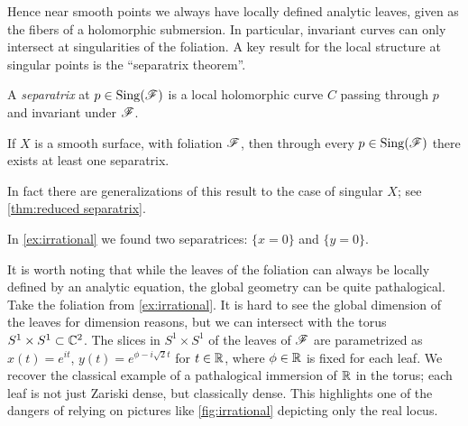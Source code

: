 Hence near smooth points we always have locally defined analytic leaves, given
as the fibers of a holomorphic submersion. In particular, invariant curves can
only intersect at singularities of the foliation. A key result for the local
structure at singular points is the ``separatrix theorem''.

\begin{definition}
    A \emph{separatrix} at $p\in\operatorname{Sing}(\mathscr{F})$ is a local holomorphic curve $C$
    passing through $p$ and invariant under $\mathscr{F}$.
\end{definition}

\begin{theorem}\label{thm:separatrix}
    If $X$ is a smooth surface, with foliation $\mathscr{F}$, then through every
    $p\in\operatorname{Sing}(\mathscr{F})$ there exists at least one separatrix.
\end{theorem}

In fact there are generalizations of this result to the case of singular $X$;
see \cref{thm:reduced separatrix}.

\begin{example}
    In \cref{ex:irrational} we found two separatrices: $\{x=0\}$ and
    $\{y=0\}$.
\end{example}

It is worth noting that while the leaves of the foliation can always be locally
defined by an analytic equation, the global geometry can be quite pathalogical.
Take the foliation from \cref{ex:irrational}. It is hard to see the global
dimension of the leaves for dimension reasons, but we can intersect with the
torus $S^1\times S^1\subset\mathbb{C}^2$. The slices in $S^1\times S^1$ of the leaves of
$\mathscr{F}$ are parametrized as $x(t)=e^{it}$, $y(t)=e^{\phi-i\sqrt2t}$ for
$t\in\mathbb{R}$, where $\phi\in\mathbb{R}$ is fixed for each leaf. We recover the classical
example of a pathalogical immersion of $\mathbb{R}$ in the torus; each leaf is not just
Zariski dense, but classically dense. This highlights one of the dangers of
relying on pictures like \cref{fig:irrational} depicting only the real locus.


